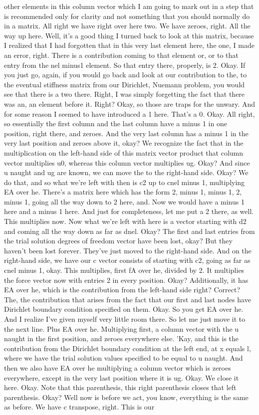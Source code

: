\documentclass[10pt]{article}
\begin{document}
other elements in this column vector which I am going to mark out in a step that is recommended only for clarity and not something that you should normally do in a matrix. All right we have right over here two. We have zeroes, right.  All the way up here. Well, it's a good thing I turned back to look at this matrix, because I realized that I had forgotten that in this very last element here, the one, I made an error, right. There is a contribution coming to that element or, or to that entry from the nel minus1 element. So that entry there, properly, is 2. Okay. If you just go, again, if you would go back and look at our contribution to the, to the eventual stiffness matrix from our Dirichlet, Nuemann problem, you would see that there is a two there. Right, I was simply forgetting the fact that there was an, an element before it. Right? Okay, so those are traps for the unwary. And for some reason I seemed to have introduced a 1 here. That's a 0. Okay. All right, so essentially the first column and the last column have a minus 1 in one position, right there, and zeroes. And the very last column has a minus 1 in the very last position and zeroes above it, okay? We recognize the fact that in the multiplication on the left-hand side of this matrix vector product that column vector multiplies u0, whereas this column vector multiplies ug. Okay? And since u naught and ug are known, we can move the to the right-hand side. Okay? We do that, and so what we're left with then is c2 up to cnel minus 1, multiplying EA over he. There's a matrix here which has the form 2, minus 1, minus 1, 2, minus 1, going all the way down to 2 here, and. Now we would have a minus 1 here and a minus 1 here. And just for completeness, let me put a 2 there, as well. This multiplies now. Now what we're left with here is a vector starting with d2 and coming all the way down as far as dnel. Okay? The first and last entries from the trial solution degrees of freedom vector have been lost, okay? But they haven't been lost forever. They've just moved to the right-hand side. And on the right-hand side, we have our c vector consists of starting with c2, going as far as cnel minus 1, okay. This multiplies, first fA over he, divided by 2. It multiplies the force vector now with entries 2 in every position. Okay? Additionally, it has EA over he, which is the contribution from the left-hand side right? Correct? The, the contribution that arises from the fact that our first and last nodes have Dirichlet boundary condition specified on them. Okay. So you get EA over he. And I realize I've given myself very little room there. So let me just move it to the next line.  Plus EA over he. Multiplying first, a column vector with the u naught in the first position, and zeroes everywhere else. 'Kay, and this is the contribution from the Dirichlet boundary condition at the left end, at x equals l, where we have the trial solution values specified to be equal to u naught. And then we also have EA over he multiplying a column vector which is zeroes everywhere, except in the very last position where it is ug. Okay. We close it here. Okay. Note that this parenthesis, this right parenthesis closes that left parenthesis. Okay?  Well now is before we act, you know, everything is the same as before. We have c transpose, right. This is our 
\end{document}
